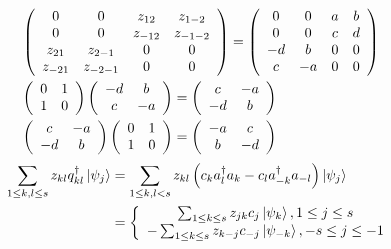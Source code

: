 \documentclass[aps,preprint]{revtex4}%
\begin{document}
\begin{align}
&  \left(
\begin{array}
[c]{cccc}%
0 & 0 & z_{12} & z_{1-2}\\
0 & 0 & z_{-12} & z_{-1-2}\\
z_{21} & z_{2-1} & 0 & 0\\
z_{-21} & z_{-2-1} & 0 & 0
\end{array}
\right)  =\left(
\begin{array}
[c]{cccc}%
0 & 0 & a & b\\
0 & 0 & c & d\\
-d & b & 0 & 0\\
c & -a & 0 & 0
\end{array}
\right) \\
&  \left(
\begin{array}
[c]{cc}%
0 & 1\\
1 & 0
\end{array}
\right)  \left(
\begin{array}
[c]{cc}%
-d & b\\
c & -a
\end{array}
\right)  =\left(
\begin{array}
[c]{cc}%
c & -a\\
-d & b
\end{array}
\right) \\
&  \left(
\begin{array}
[c]{cc}%
c & -a\\
-d & b
\end{array}
\right)  \left(
\begin{array}
[c]{cc}%
0 & 1\\
1 & 0
\end{array}
\right)  =\left(
\begin{array}
[c]{cc}%
-a & c\\
b & -d
\end{array}
\right)
\end{align}%
\begin{align}
\sum_{1\leq k,l\leq s}z_{kl}q_{kl}^{\dagger}\left\vert \psi_{j}\right\rangle
&  =\sum_{1\leq k,l<s}z_{kl}\left(  c_{k}a_{l}^{\dagger}a_{k}-c_{l}%
a_{-k}^{\dagger}a_{-l}\right)  \left\vert \psi_{j}\right\rangle \\
&  =\left\{
\begin{array}
[c]{c}%
\sum_{1\leq k\leq s}z_{jk}c_{j}\left\vert \psi_{k}\right\rangle ,1\leq j\leq
s\\
-\sum_{1\leq k\leq s}z_{k-j}c_{-j}\left\vert \psi_{-k}\right\rangle ,-s\leq
j\leq-1
\end{array}
\right.
\end{align}%
\end{document}
